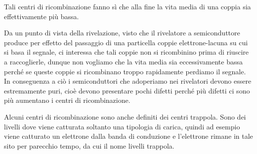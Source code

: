 Tali centri di ricombinazione fanno sì che alla fine la vita media di una coppia sia effettivamente più bassa.

\vspace{0.2cm}Da un punto di vista della rivelazione, visto che il rivelatore a semiconduttore produce per effetto del passaggio di una particella coppie elettrone-lacuna su cui si basa il segnale, ci interessa che tali coppie non si ricombinino prima di riuscire a raccoglierle, dunque non vogliamo che la vita media sia eccessivamente bassa perché se queste coppie si ricombinano troppo rapidamente perdiamo il segnale. In conseguenza a ciò i semiconduttori che adoperiamo nei rivelatori devono essere estremamente puri, cioè devono presentare pochi difetti perché più difetti ci sono più aumentano i centri di ricombinazione.

Alcuni centri di ricombinazione sono anche definiti dei centri trappola. Sono dei livelli dove viene catturata soltanto una tipologia di carica, quindi ad esempio viene catturato un elettrone dalla banda di conduzione e l'elettrone rimane in tale sito per parecchio tempo, da cui il nome livelli trappola.

